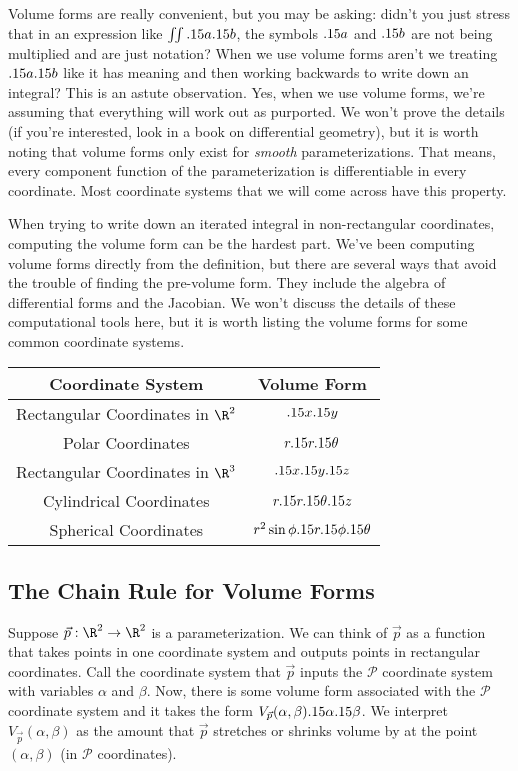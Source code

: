 Volume forms are really convenient, but you may be asking: didn't you just stress that
in an expression like $\iint .15 a.15 b$, the symbols $.15 a$ and $.15 b$ are not being multiplied
and are just notation?  When we use volume forms aren't we treating $.15 a .15 b$ like it has meaning
and then working backwards to write down an integral?  This is an astute observation.  Yes,
when we use volume forms, we're assuming that everything will work out as purported.  We won't prove
the details (if you're interested, look in a book on differential geometry), but it is worth noting
that volume forms only exist for \emph{smooth} parameterizations.  That means, every component function
of the parameterization is differentiable in every coordinate.  Most coordinate systems that we
will come across have this property.

When trying to write down an iterated integral in non-rectangular coordinates, computing the volume
form can be the hardest part.  We've been computing volume forms directly from the definition, but
there are several ways that avoid the trouble of finding the pre-volume form.  They include 
the algebra of differential forms and the Jacobian.  We won't discuss the details of these computational
tools here, but it is worth listing the volume forms for some common coordinate systems.

\begin{center}
	\begin{tabular}{c c}
		Coordinate System & Volume Form\\
		\hline
		Rectangular Coordinates in $\R^2$ & $.15 x.15 y$\\
		Polar Coordinates & $r.15 r.15 \theta$\\
		Rectangular Coordinates in $\R^3$ & $.15 x.15 y.15 z$\\
		Cylindrical Coordinates & $r.15 r.15 \theta.15 z$\\
		Spherical Coordinates & $r^2\sin\phi.15 r.15 \phi.15 \theta$
	\end{tabular}
\end{center}

\subsection{The Chain Rule for Volume Forms}
Suppose $\vec p:\R^2\to\R^2$ is a parameterization.  We can think of $\vec p$ as a function
that takes points in one coordinate system and outputs points in rectangular coordinates.
Call the coordinate system that $\vec p$ inputs the $\mathcal P$ coordinate system with variables
$\alpha$ and $\beta$.  Now, there is some volume form associated with the $\mathcal P$ coordinate
system and it takes the form $V_{\vec p}(\alpha,\beta).15\alpha .15\beta$.  We interpret $V_{\vec p}(\alpha,\beta)$
as the amount that $\vec p$ stretches or shrinks volume by at the point $(\alpha,\beta)$ (in $\mathcal P$ coordinates).

